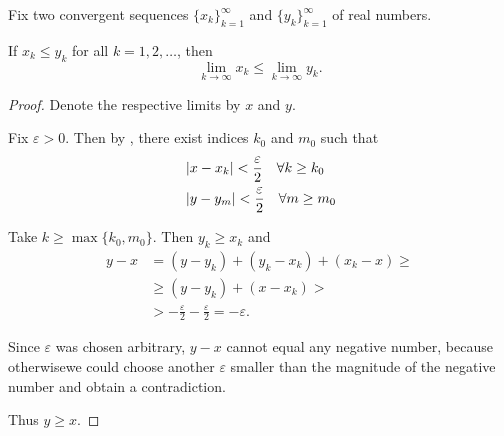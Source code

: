 \begin{proposition}\label{thm:one_sided_squeeze_lemma}
  Fix two convergent sequences \( \{ x_k \}_{k=1}^\infty \) and \( \{ y_k \}_{k=1}^\infty \) of real numbers.

  If \( x_k \leq y_k \) for all \( k = 1, 2, \ldots \), then
  \begin{equation*}
    \lim_{k \to \infty} x_k \leq \lim_{k \to \infty} y_k.
  \end{equation*}
\end{proposition}
\begin{proof}
  Denote the respective limits by \( x \) and \( y \).

  Fix \( \varepsilon > 0 \). Then by , there exist indices \( k_0 \) and \( m_0 \) such that
  \begin{align*}
    &\left\vert x - x_k \right\vert < \frac \varepsilon 2 \quad\forall k \geq k_0 \\
    &\left\vert y - y_m \right\vert < \frac \varepsilon 2 \quad\forall m \geq m_0
  \end{align*}

  Take \( k \geq \max \{ k_0, m_0 \} \). Then \( y_k \geq x_k \) and
  \begin{align*}
    y - x
    &=
    (y - y_k) + (y_k - x_k) + (x_k - x)
    \geq \\ &\geq
    (y - y_k) + (x - x_k)
    > \\ &>
    - \frac \varepsilon 2 - \frac \varepsilon 2
    =
    - \varepsilon.
  \end{align*}

  Since \( \varepsilon \) was chosen arbitrary, \( y - x \) cannot equal any negative number, because otherwise\LEM we could choose another \( \varepsilon \) smaller than the magnitude of the negative number and obtain a contradiction.

  Thus \( y \geq x \).
\end{proof}

